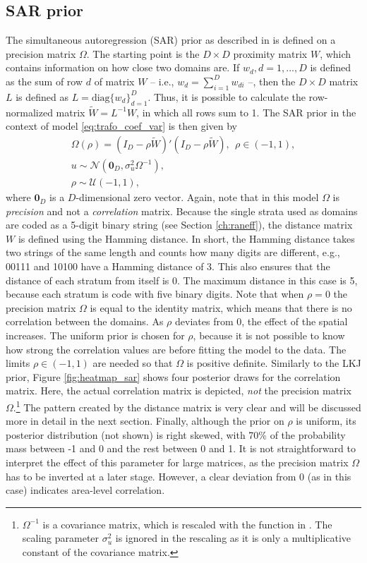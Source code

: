 \subsection{SAR prior}
The simultaneous autoregression (SAR) prior as described in \cite{chung_bayesian_2020} is defined on a precision matrix $\Omega$.
The starting point is the $D\times D$ proximity matrix $W$, which contains information on how close two domains are.
If $w_d, d = 1, ..., D$ is defined as the sum of row $d$ of matrix $W$ – i.e., $w_d = \displaystyle \sum_{i = 1}^D w_{di}$ –, then the $D \times D$ matrix $L$ is defined as $L = \text{diag}\{w_d\}_{d=1}^D$.
Thus, it is possible to calculate the row-normalized matrix $\widetilde W = L^{-1}W$, in which all rows sum to 1.
The SAR prior in the context of model \ref{eq:trafo_coef_var} is then given by
\begin{gather*}
    \Omega(\rho) = (I_D - \rho \widetilde W)'(I_D - \rho \widetilde W), ~~ \rho \in (-1, 1),\\
    u \sim \mathcal N(\boldsymbol{0}_D, \sigma_u^2 \Omega^{-1}),\\
    \rho \sim \mathcal U(-1, 1),
\end{gather*}
where $\boldsymbol{0}_D$ is a $D$-dimensional zero vector.
Again, note that in this model $\Omega$ is \textit{precision} and not a \textit{correlation} matrix.
Because the single strata used as domains are coded as a 5-digit binary string (see Section \ref{ch:raneff}), the distance matrix $W$ is defined using the Hamming distance.
In short, the Hamming distance takes two strings of the same length and counts how many digits are different, e.g., 00111 and 10100 have a Hamming distance of 3.
This also ensures that the distance of each stratum from itself is 0.
The maximum distance in this case is 5, because each stratum is code with five binary digits.
Note that when $\rho = 0$ the precision matrix $\Omega$ is equal to the identity matrix, which means that there is no correlation between the domains.
As $\rho$ deviates from 0, the effect of the spatial increases.
The uniform prior is chosen for $\rho$, because it is not possible to know how strong the correlation values are before fitting the model to the data.
The limits $\rho \in (-1, 1)$ are needed so that $\Omega$ is positive definite.
Similarly to the LKJ prior, Figure \ref{fig:heatmap_sar} shows four posterior draws for the correlation matrix.
Here, the actual correlation matrix is depicted, \textit{not} the precision matrix $\Omega$.\footnote{$\Omega^{-1}$ is a covariance matrix, which is rescaled with the  function in . The scaling parameter $\sigma^2_u$ is ignored in the rescaling as it is only a multiplicative constant of the covariance matrix.}
The pattern created by the distance matrix is very clear and will be discussed more in detail in the next section.
Finally, although the prior on $\rho$ is uniform, its posterior distribution (not shown) is right skewed, with 70\% of the probability mass between -1 and 0 and the rest between 0 and 1.
It is not straightforward to interpret the effect of this parameter for large matrices, as the precision matrix $\Omega$ has to be inverted at a later stage.
However, a clear deviation from 0 (as in this case) indicates area-level correlation.

